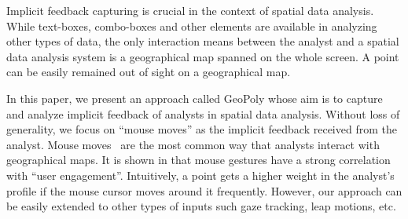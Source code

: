 \documentclass{vldb}
\begin{document}
\vspace{2pt}
Implicit feedback capturing is crucial in the context of spatial data analysis. While text-boxes, combo-boxes and other elements are available in analyzing other types of data, the only interaction means between the analyst and a spatial data analysis system is a geographical map spanned on the whole screen. A point can be easily remained out of sight on a geographical map.

\vspace{2pt}
In this paper, we present an approach called {\sc GeoPoly} whose aim is to capture and analyze implicit feedback of analysts in spatial data analysis. Without loss of generality, we focus on ``mouse moves'' as the implicit feedback received from the analyst. Mouse moves~\cite{Chen:2001} are the most common way that analysts interact with geographical maps. It is shown in \cite{Arapakis:2014} that mouse gestures have a strong correlation with ``user engagement''. Intuitively, a point gets a higher weight in the analyst's profile if the mouse cursor moves around it frequently.  However, our approach can be easily extended to other types of inputs such gaze tracking, leap motions, etc.


 
\end{document}

